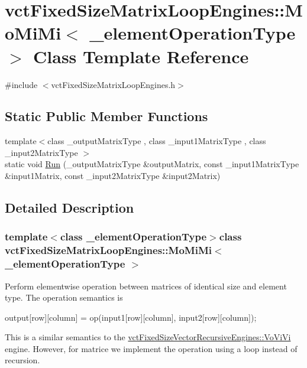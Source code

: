 \hypertarget{classvct_fixed_size_matrix_loop_engines_1_1_mo_mi_mi}{}\section{vct\+Fixed\+Size\+Matrix\+Loop\+Engines\+:\+:Mo\+Mi\+Mi$<$ \+\_\+element\+Operation\+Type $>$ Class Template Reference}
\label{classvct_fixed_size_matrix_loop_engines_1_1_mo_mi_mi}


{\ttfamily \#include $<$vct\+Fixed\+Size\+Matrix\+Loop\+Engines.\+h$>$}

\subsection*{Static Public Member Functions}
\begin{DoxyCompactItemize}
\item 
{\footnotesize template$<$class \+\_\+output\+Matrix\+Type , class \+\_\+input1\+Matrix\+Type , class \+\_\+input2\+Matrix\+Type $>$ }\\static void \hyperlink{classvct_fixed_size_matrix_loop_engines_1_1_mo_mi_mi_ad29d9351a16c8b34d3aa7e8b71969b6e}{Run} (\+\_\+output\+Matrix\+Type \&output\+Matrix, const \+\_\+input1\+Matrix\+Type \&input1\+Matrix, const \+\_\+input2\+Matrix\+Type \&input2\+Matrix)
\end{DoxyCompactItemize}


\subsection{Detailed Description}
\subsubsection*{template$<$class \+\_\+element\+Operation\+Type$>$class vct\+Fixed\+Size\+Matrix\+Loop\+Engines\+::\+Mo\+Mi\+Mi$<$ \+\_\+element\+Operation\+Type $>$}

Perform elementwise operation between matrices of identical size and element type. The operation semantics is 
\begin{DoxyCode}
output[row][column] = op(input1[row][column], input2[row][column]);
\end{DoxyCode}


This is a similar semantics to the \hyperlink{classvct_fixed_size_vector_recursive_engines_1_1_vo_vi_vi}{vct\+Fixed\+Size\+Vector\+Recursive\+Engines\+::\+Vo\+Vi\+Vi} engine. However, for matrice we implement the operation using a loop instead of recursion.

